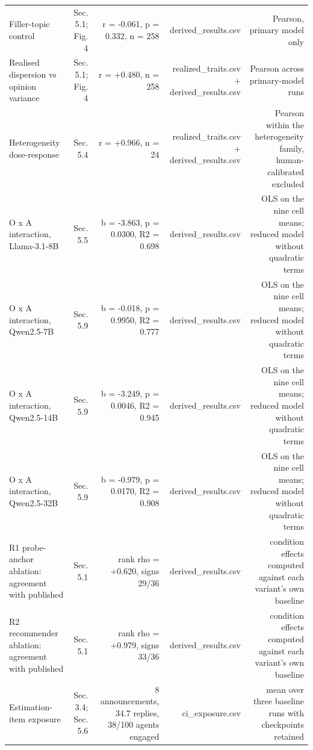 \documentclass[11pt]{article}
\begin{document}
\begin{longtable}{@{}lrrrr@{}}
Filler-topic control & Sec. 5.1; Fig. 4 & r = -0.061, p = 0.332, n = 258 & derived\_results.csv & Pearson, primary model only \\
Realised dispersion vs opinion variance & Sec. 5.1; Fig. 4 & r = +0.480, n = 258 & realized\_traits.csv + derived\_results.csv & Pearson across primary-model runs \\
Heterogeneity dose-response & Sec. 5.4 & r = +0.966, n = 24 & realized\_traits.csv + derived\_results.csv & Pearson within the heterogeneity family, human-calibrated excluded \\
O x A interaction, Llama-3.1-8B & Sec. 5.5 & b = -3.863, p = 0.0300, R2 = 0.698 & derived\_results.csv & OLS on the nine cell means; reduced model without quadratic terms \\
O x A interaction, Qwen2.5-7B & Sec. 5.9 & b = -0.018, p = 0.9950, R2 = 0.777 & derived\_results.csv & OLS on the nine cell means; reduced model without quadratic terms \\
O x A interaction, Qwen2.5-14B & Sec. 5.9 & b = -3.249, p = 0.0046, R2 = 0.945 & derived\_results.csv & OLS on the nine cell means; reduced model without quadratic terms \\
O x A interaction, Qwen2.5-32B & Sec. 5.9 & b = -0.979, p = 0.0170, R2 = 0.908 & derived\_results.csv & OLS on the nine cell means; reduced model without quadratic terms \\
R1 probe-anchor ablation: agreement with published & Sec. 5.1 & rank rho = +0.620, signs 29/36 & derived\_results.csv & condition effects computed against each variant's own baseline \\
R2 recommender ablation: agreement with published & Sec. 5.1 & rank rho = +0.979, signs 33/36 & derived\_results.csv & condition effects computed against each variant's own baseline \\
Estimation-item exposure & Sec. 3.4; Sec. 5.6 & 8 announcements, 34.7 replies, 38/100 agents engaged & ci\_exposure.csv & mean over three baseline runs with checkpoints retained \\
\bottomrule
\end{longtable}
\normalsize

\medskip
\end{document}
